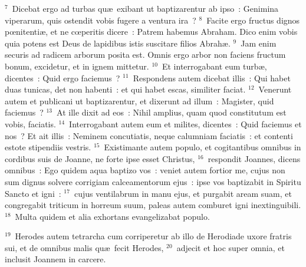 ${}^{7}$~Dicebat ergo ad turbas qu\ae\ exibant ut baptizarentur ab ipso~: Genimina viperarum, quis ostendit vobis fugere a ventura ira~?
${}^{8}$~Facite ergo fructus dignos pœnitenti\ae , et ne cœperitis dicere~: Patrem habemus Abraham. Dico enim vobis quia potens est Deus de lapidibus istis suscitare filios Abrah\ae .
${}^{9}$~Jam enim securis ad radicem arborum posita est. Omnis ergo arbor non faciens fructum bonum, excidetur, et in ignem mittetur.
${}^{10}$~Et interrogabant eum turb\ae , dicentes~: Quid ergo faciemus~?
${}^{11}$~Respondens autem dicebat illis~: Qui habet duas tunicas, det non habenti~: et qui habet escas, similiter faciat.
${}^{12}$~Venerunt autem et publicani ut baptizarentur, et dixerunt ad illum~: Magister, quid faciemus~?
${}^{13}$~At ille dixit ad eos~: Nihil amplius, quam quod constitutum est vobis, faciatis.
${}^{14}$~Interrogabant autem eum et milites, dicentes~: Quid faciemus et nos~? Et ait illis~: Neminem concutiatis, neque calumniam faciatis~: et contenti estote stipendiis vestris.
${}^{15}$~Existimante autem populo, et cogitantibus omnibus in cordibus suis de Joanne, ne forte ipse esset Christus,
${}^{16}$~respondit Joannes, dicens omnibus~: Ego quidem aqua baptizo vos~: veniet autem fortior me, cujus non sum dignus solvere corrigiam calceamentorum ejus~: ipse vos baptizabit in Spiritu Sancto et igni~:
${}^{17}$~cujus ventilabrum in manu ejus, et purgabit aream suam, et congregabit triticum in horreum suum, paleas autem comburet igni inextinguibili.
${}^{18}$~Multa quidem et alia exhortans evangelizabat populo.


${}^{19}$~Herodes autem tetrarcha cum corriperetur ab illo de Herodiade uxore fratris sui, et de omnibus malis qu\ae\ fecit Herodes,
${}^{20}$~adjecit et hoc super omnia, et inclusit Joannem in carcere.


